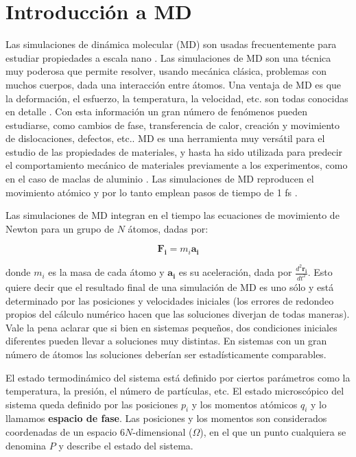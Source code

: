 \section{Introducción a MD}
\label{S2_2}

Las simulaciones de dinámica molecular (MD) son usadas frecuentemente para estudiar propiedades a escala nano \citep{allen87}. Las simulaciones de MD son una técnica muy poderosa que permite resolver, usando mecánica clásica, problemas con muchos cuerpos, dada una interacción entre átomos. Una ventaja de MD es que la deformación, el esfuerzo, la temperatura, la velocidad, etc. son todas conocidas en detalle \citep{allen87}. Con esta información un gran número de fenómenos pueden estudiarse, como cambios de fase, transferencia de calor, creación y movimiento de dislocaciones, defectos, etc.. MD es una herramienta muy versátil para el estudio de las propiedades de materiales, y hasta ha sido utilizada para predecir el comportamiento mecánico de materiales previamente a los experimentos, como en el caso de maclas de aluminio \citep{chen03}. Las simulaciones de MD reproducen el movimiento atómico y por lo tanto emplean pasos de tiempo de 1 fs \citep{allen87}.

Las simulaciones de MD integran en el tiempo las ecuaciones de movimiento de Newton para un grupo de $N$ átomos, dadas por:

\begin{equation}
\mathbf{F_{i}} = m_{i}\mathbf{a_{i}}
\end{equation}

donde $m_{i}$ es la masa de cada átomo y $\mathbf{a_{i}}$ es su aceleración, dada por $\frac{d^{2}\mathbf{r_{i}}}{dt^{2}}$. Esto quiere decir que el resultado final de una simulación de MD es uno sólo y está determinado por las posiciones y velocidades iniciales (los errores de redondeo propios del cálculo numérico hacen que las soluciones diverjan de todas maneras). Vale la pena aclarar que si bien en sistemas pequeños, dos condiciones iniciales diferentes pueden llevar a soluciones muy distintas. En sistemas con un gran número de átomos las soluciones deberían ser estadísticamente comparables.

El estado termodinámico del sistema está definido por ciertos parámetros como la temperatura, la presión, el número de partículas, etc. El estado microscópico del sistema queda definido por las posiciones $p_{i}$ y los momentos atómicos $q_{i}$ y lo llamamos \textbf{espacio de fase}. Las posiciones y los momentos son considerados coordenadas de un espacio $6N$-dimensional ($\Omega$), en el que un punto cualquiera se denomina $P$ y describe el estado del sistema. 

